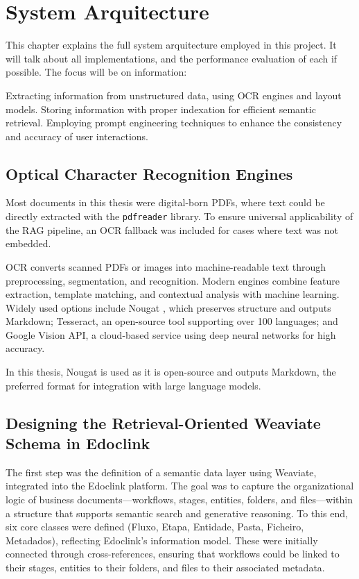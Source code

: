 \chapter{System Arquitecture}
\label{chapter:Methodologies}
This chapter explains the full system arquitecture employed in this project. It will talk about all implementations, and the performance evaluation of each if possible. The focus will be on information:

Extracting information from unstructured data, using OCR engines and layout models.
Storing information with proper indexation for efficient semantic retrieval.
Employing prompt engineering techniques to enhance the consistency and accuracy of user interactions. 

\section{Optical Character Recognition Engines}
\label{sec:ocr}
Most documents in this thesis were digital-born PDFs, where text could be directly extracted with the \texttt{pdfreader} library. To ensure universal applicability of the RAG pipeline, an OCR fallback was included for cases where text was not embedded. 

OCR converts scanned PDFs or images into machine-readable text through preprocessing, segmentation, and recognition. Modern engines combine feature extraction, template matching, and contextual analysis with machine learning. Widely used options include Nougat \cite{blecher2023nougatneuralopticalunderstanding}, which preserves structure and outputs Markdown; Tesseract, an open-source tool supporting over 100 languages; and Google Vision API, a cloud-based service using deep neural networks for high accuracy.

In this thesis, Nougat is used as it is open-source and outputs Markdown, the preferred format for integration with large language models.



\section{Designing the Retrieval-Oriented Weaviate Schema in Edoclink}
\label{sec:schema}

The first step was the definition of a semantic data layer using Weaviate, integrated into the Edoclink platform. The goal was to capture the organizational logic of business documents—workflows, stages, entities, folders, and files—within a structure that supports semantic search and generative reasoning. To this end, six core classes were defined (Fluxo, Etapa, Entidade, Pasta, Ficheiro, Metadados), reflecting Edoclink’s information model. These were initially connected through cross-references, ensuring that workflows could be linked to their stages, entities to their folders, and files to their associated metadata.

